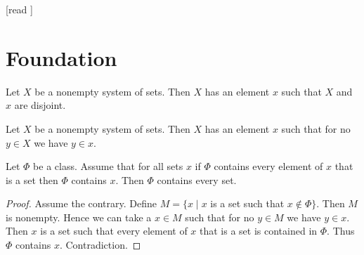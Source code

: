 \documentclass[10pt]{article}
\begin{document}
  \begin{imports}
    \begin{forthel}
      [read ]
    \end{forthel}
  \end{imports}


  \section{Foundation}

  \begin{forthel}
    \begin{axiom}[title=Foundation,id=FOUNDATIONS_10_1320008569323520,printid]
      Let $X$ be a nonempty system of sets.
      Then $X$ has an element $x$ such that $X$ and $x$ are disjoint.
    \end{axiom}
  \end{forthel}

  \begin{forthel}
    \begin{corollary}[id=FOUNDATIONS_10_9532145874510315,printid]
      Let $X$ be a nonempty system of sets.
      Then $X$ has an element $x$ such that for no $y \in X$ we have $y \in x$.
    \end{corollary}
  \end{forthel}

  \begin{forthel}
    \begin{proposition}[id=FOUNDATIONS_11_2812087589928960,printid]
      Let $\Phi$ be a class.
      Assume that for all sets $x$ if $\Phi$ contains every element of $x$ that is a set then $\Phi$ contains $x$.
      Then $\Phi$ contains every set.
    \end{proposition}
    \begin{proof}
      Assume the contrary.
      Define $M = \{ x \mid x$ is a set such that $x \notin \Phi \}$.
      Then $M$ is nonempty.
      Hence we can take a $x \in M$ such that for no $y \in M$ we have $y \in x$.
      Then $x$ is a set such that every element of $x$ that is a set is contained in $\Phi$.
      Thus $\Phi$ contains $x$.
      Contradiction.
    \end{proof}
  \end{forthel}
\end{document}
